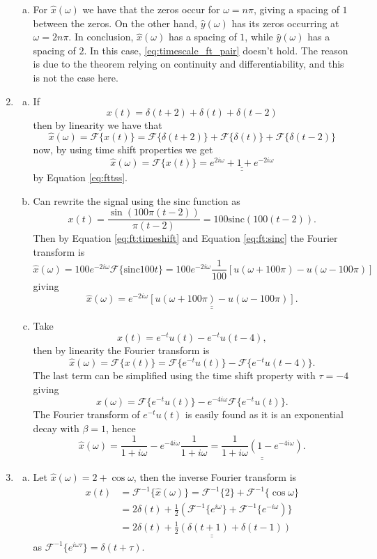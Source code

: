 \begin{enumerate}
\begin{enumerate}[a)]
\item For $\hat{x}(\omega)$ we have that the zeros occur for $\omega=n\pi$, giving a spacing of $1$ between the zeros. On the other hand, $\hat{y}(\omega)$ has its zeros occurring at $\omega=2n\pi$. In conclusion, $\hat{x}(\omega)$ has a spacing of $1$, while $\hat{y}(\omega)$ has a spacing of $2$. In this case, \ref{eq:timescale_ft_pair} doesn't hold. The reason is due to the theorem relying on continuity and differentiability, and this is not the case here. 
\end{enumerate}
\item
\begin{enumerate}[a)]
\item If 
$$x(t)=\delta(t+2)+\delta(t)+\delta(t-2)$$
then by linearity we have that
$$\hat{x}(\omega)=\mathcal{F}\{x(t)\}=\mathcal{F}\{\delta(t+2)\}+\mathcal{F}\{\delta(t)\}+\mathcal{F}\{\delta(t-2)\}$$
now, by using time shift properties we get
$$\hat{x}(\omega)=\mathcal{F}\{x(t)\}=\underline{\underline{e^{2i\omega}+1+e^{-2i\omega}}}$$
by Equation \ref{eq:fttss}.

\item Can rewrite the signal using the sinc function as
$$x(t)=\frac{\sin(100\pi(t-2))}{\pi(t-2)}=100\text{sinc}(100(t-2)).$$
Then by Equation \ref{eq:ft:timeshift} and Equation \ref{eq:ft:sinc} the Fourier transform is
$$\hat{x}(\omega)=100e^{-2i\omega}\mathcal{F}\{\text{sinc}100t\}=100e^{-2i\omega} \frac{1}{100}[u(\omega+100\pi)-u(\omega-100\pi)]$$
giving
$$\hat{x}(\omega)=\underline{\underline{e^{-2i\omega}[u(\omega+100\pi)-u(\omega-100\pi)]}}.$$

\item Take
$$x(t)=e^{-t}u(t)-e^{-t}u(t-4),$$
then by linearity the Fourier transform is
$$\hat{x}(\omega)=\mathcal{F}\{x(t)\}=\mathcal{F}\{e^{-t}u(t)\}-\mathcal{F}\{e^{-t}u(t-4)\}.$$
The last term can be simplified using the time shift property with $\tau=-4$ giving
$$\hat{x}(\omega)=\mathcal{F}\{e^{-t}u(t)\}-e^{-4i\omega}\mathcal{F}\{e^{-t}u(t)\}.$$
The Fourier transform of $e^{-t}u(t)$ is easily found as it is an exponential decay with $\beta=1$, hence
$$\hat{x}(\omega)=\frac{1}{1+i\omega}-e^{-4i\omega}\frac{1}{1+i\omega}=\underline{\underline{\frac{1}{1+i\omega}\left(1-e^{-4i\omega}\right)}}.$$
\end{enumerate}


\item
\begin{enumerate}[a)]
\item Let $\hat{x}(\omega)=2+\cos\omega$, then the inverse Fourier transform is
\begin{align*}
    x(t)&=\mathcal{F}^{-1}\{\hat{x}(\omega)\}=\mathcal{F}^{-1}\{2\}+\mathcal{F}^{-1}\{\cos\omega\} \\
    &=2\delta(t)+\frac{1}{2}(\mathcal{F}^{-1}\{e^{i\omega}\}+\mathcal{F}^{-1}\{e^{-i\omega})\} \\ &=\underline{\underline{2\delta(t)+\frac{1}{2}(\delta(t+1)+\delta(t-1))}}
\end{align*}
as $\mathcal{F}^{-1}\{e^{i\omega\tau}\}=\delta(t+\tau)$.


\end{enumerate}
\end{enumerate}
